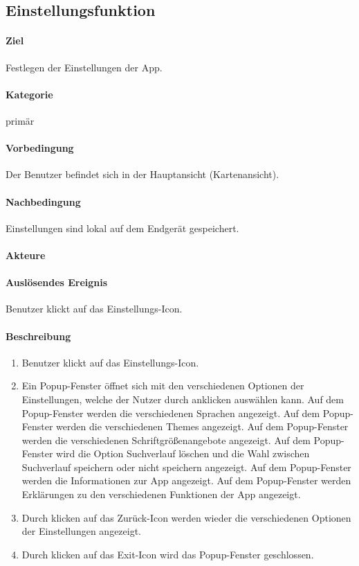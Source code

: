 \subsection{Einstellungsfunktion}
\label{Einstellungsfunktion}
\paragraph{Ziel}
Festlegen der Einstellungen der App.
\paragraph{Kategorie}
primär
\paragraph{Vorbedingung}
Der Benutzer befindet sich in der Hauptansicht (Kartenansicht).
\paragraph{Nachbedingung}
Einstellungen sind lokal auf dem Endgerät gespeichert.
\paragraph{Akteure}

\paragraph{Auslösendes Ereignis}
Benutzer klickt auf das Einstellungs-Icon.
\paragraph{Beschreibung}
\begin{enumerate}
    \item Benutzer klickt auf das Einstellungs-Icon.
    \item Ein Popup-Fenster öffnet sich mit den verschiedenen Optionen der Einstellungen, welche der Nutzer durch anklicken auswählen kann.
     Auf dem Popup-Fenster werden die verschiedenen Sprachen angezeigt.
     Auf dem Popup-Fenster werden die verschiedenen Themes angezeigt.
     Auf dem Popup-Fenster werden die verschiedenen Schriftgrößenangebote angezeigt.
     Auf dem Popup-Fenster wird die Option Suchverlauf löschen und die Wahl zwischen Suchverlauf speichern oder nicht speichern angezeigt.
     Auf dem Popup-Fenster werden die Informationen zur App angezeigt.
     Auf dem Popup-Fenster werden Erklärungen zu den verschiedenen Funktionen der App angezeigt.
    \item Durch klicken auf das Zurück-Icon werden wieder die verschiedenen Optionen der Einstellungen angezeigt.
    \item Durch klicken auf das Exit-Icon wird das Popup-Fenster geschlossen.
\end{enumerate}